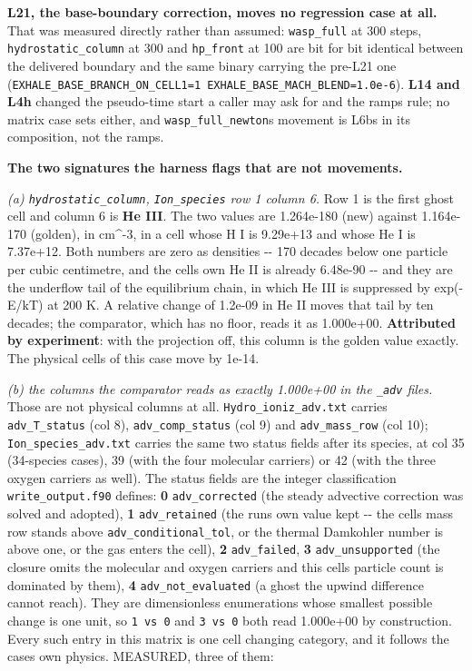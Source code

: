 \documentclass[english,a4paper]{my_memo}
\begin{document}
\textbf{L21, the base-boundary correction, moves no regression case at all.} That
was measured directly rather than assumed: \texttt{wasp\_full} at 300 steps,
\texttt{hydrostatic\_column} at 300 and \texttt{hp\_front} at 100 are bit for bit identical
between the delivered boundary and the same binary carrying the pre-L21 one
(\texttt{EXHALE\_BASE\_BRANCH\_ON\_CELL1=1\ EXHALE\_BASE\_MACH\_BLEND=1.0e-6}). \textbf{L14 and
L4h} changed the pseudo-time start a caller may ask for and the ramp\textquotesingle s
rule; no matrix case sets either, and \texttt{wasp\_full\_newton}\textquotesingle s movement is L6b\textquotesingle s
in its composition, not the ramp\textquotesingle s.

\textbf{The two signatures the harness flags that are not movements.}

\emph{(a) \texttt{hydrostatic\_column}, \texttt{Ion\_species} row 1 column 6.} Row 1 is the first
ghost cell and column 6 is \textbf{He III}. The two values are 1.264e-180 (new)
against 1.164e-170 (golden), in cm\^{}-3, in a cell whose H I is 9.29e+13 and
whose He I is 7.37e+12. Both numbers are zero as densities -\/- 170 decades
below one particle per cubic centimetre, and the cell\textquotesingle s own He II is already
6.48e-90 -\/- and they are the underflow tail of the equilibrium chain, in which
He III is suppressed by exp(-E/kT) at 200 K. A relative change of 1.2e-09 in
He II moves that tail by ten decades; the comparator, which has no floor,
reads it as 1.000e+00. \textbf{Attributed by experiment}: with the projection off,
this column is the golden value exactly. The physical cells of this case move
by 1e-14.

\emph{(b) the columns the comparator reads as exactly 1.000e+00 in the \texttt{\_adv}
files.} Those are not physical columns at all. \texttt{Hydro\_ioniz\_adv.txt} carries
\texttt{adv\_T\_status} (col 8), \texttt{adv\_comp\_status} (col 9) and \texttt{adv\_mass\_row} (col 10);
\texttt{Ion\_species\_adv.txt} carries the same two status fields after its species, at
col 35 (34-species cases), 39 (with the four molecular carriers) or 42 (with
the three oxygen carriers as well). The status fields are the integer
classification \texttt{write\_output.f90} defines: \textbf{0} \texttt{adv\_corrected} (the steady
advective correction was solved and adopted), \textbf{1} \texttt{adv\_retained} (the run\textquotesingle s
own value kept -\/- the cell\textquotesingle s mass row stands above \texttt{adv\_conditional\_tol}, or
the thermal Damkohler number is above one, or the gas enters the cell), \textbf{2}
\texttt{adv\_failed}, \textbf{3} \texttt{adv\_unsupported} (the closure omits the molecular and
oxygen carriers and this cell\textquotesingle s particle count is dominated by them), \textbf{4}
\texttt{adv\_not\_evaluated} (a ghost the upwind difference cannot reach). They are
dimensionless enumerations whose smallest possible change is one unit, so
\texttt{1\ vs\ 0} and \texttt{3\ vs\ 0} both read 1.000e+00 by construction. Every such entry in
this matrix is one cell changing category, and it follows the case\textquotesingle s own
physics. MEASURED, three of them:
\end{document}
